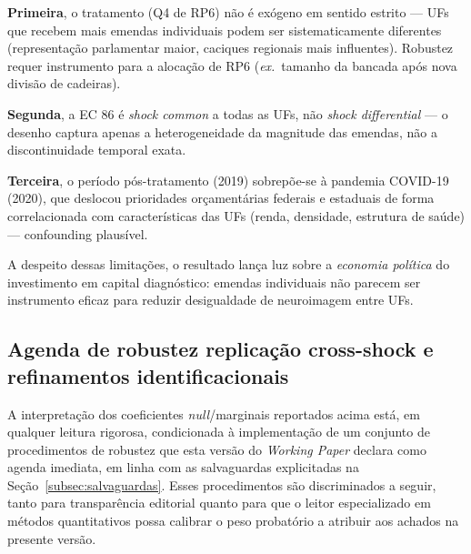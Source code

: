\documentclass[12pt,a4paper,oneside]{article}
\begin{document}
\textbf{Primeira}, o tratamento (Q4 de RP6) não é exógeno em
sentido estrito — UFs que recebem mais emendas individuais podem
ser sistematicamente diferentes (representação parlamentar maior,
caciques regionais mais influentes). Robustez requer instrumento
para a alocação de RP6 (\textit{ex.}\ tamanho da bancada após
nova divisão de cadeiras).

\textbf{Segunda}, a EC 86 é \textit{shock common} a todas as UFs,
não \textit{shock differential} — o desenho captura apenas a
heterogeneidade da magnitude das emendas, não a discontinuidade
temporal exata.

\textbf{Terceira}, o período pós-tratamento (2019)
sobrepõe-se à pandemia COVID-19 (2020), que
deslocou prioridades orçamentárias federais e estaduais de forma
correlacionada com características das UFs (renda, densidade,
estrutura de saúde) — confounding plausível.

A despeito dessas limitações, o resultado lança luz sobre a
\textit{economia política} do investimento em capital diagnóstico:
emendas individuais não parecem ser instrumento eficaz para reduzir
desigualdade de neuroimagem entre UFs.

\subsection{Agenda de robustez \textendash{} replicação cross-shock e
refinamentos identificacionais}\label{subsec:robustez-causal}

A interpretação dos coeficientes \textit{null}/marginais reportados
acima está, em qualquer leitura rigorosa, condicionada à
implementação de um conjunto de procedimentos de robustez que esta
versão do \textit{Working Paper} declara como agenda imediata, em
linha com as salvaguardas explicitadas na
Seção~\ref{subsec:salvaguardas}. Esses procedimentos são
discriminados a seguir, tanto para transparência editorial quanto
para que o leitor especializado em métodos quantitativos possa
calibrar o peso probatório a atribuir aos achados na presente
versão.
\end{document}
